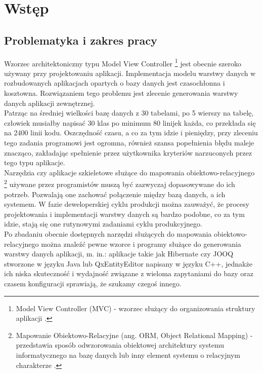 \documentclass[12pt]{report}
\begin{document}


\tableofcontents	%

\chapter{Wstęp}\label{chap:wstep} 

\section{Problematyka i zakres pracy}
Wzorzec architektoniczny typu Model View Controller
	\footnote{Model View Controller (MVC) - wzorzec służący do organizowania struktury aplikacji \cite{mvc}.}
jest obecnie szeroko używany przy projektowaniu aplikacji. Implementacja modelu warstwy danych w
rozbudowanych aplikacjach opartych o bazy danych jest czasochłonna i kosztowna. Rozwiązaniem tego
problemu jest zlecenie generowania warstwy danych aplikacji zewnętrznej. \\
	\indent Patrząc na średniej wielkości bazę danych z 30 tabelami, po 5 wierszy na tabelę,
człowiek musiałby napisać 30 klas po minimum 80 linijek każda, co przekłada się na 2400 linii kodu. 
Oszczędność czasu, a co za tym idzie i pieniędzy, przy zleceniu tego zadania programowi jest ogromna,
również szansa popełnienia błędu maleje znacząco, zakładając spełnienie przez użytkownika
kryteriów narzuconych przez tego typu aplikacje. \\
	\indent Narzędzia czy aplikacje szkieletowe służące do mapowania obiektowo-relacyj\-nego
	\footnote{Mapowanie Obiektowo-Relacyjne (ang. ORM, Object Relational Mapping) - przedstawia sposób odwzorowania obiektowej architektury
	systemu informatycznego na bazę danych lub inny element systemu o relacyjnym charakterze \cite{hibernateInAction}.}
używane przez programistów muszą być zazwyczaj dopasowywane do ich potrzeb. Pozwalają one zachować połączenie między bazą
danych, a ich systemem. W fazie deweloperskiej cyklu produkcji można zauważyć, że procesy projektowania i implementacji warstwy danych są bardzo podobne, co za tym idzie,
stają się one rutynowymi zadaniami cyklu produkcyjnego. \\
	\indent Po zbadaniu obecnie dostępnych narzędzi służących do mapowania obiektowo-relacyjnego
można znaleźć pewne wzorce i programy służące do generowania warstwy danych aplikacji, m. in.: {\color{black} aplikacje takie jak Hibernate czy JOOQ stworzone w języku Java lub QxEntityEditor napisany w języku C++}, jednakże ich niska skuteczność i wydajność związane z wieloma zapytaniami do bazy oraz czasem konfiguracji sprawiają, że szukamy czegoś innego.
\end{document}

